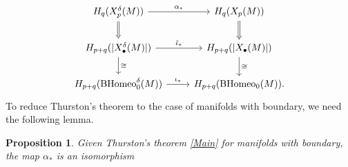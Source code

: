 \documentclass[a4paper]{amsart}
\newtheorem{prop}[thm]{Proposition}
\theoremstyle{definition}
\theoremstyle{remark}
\newcommand{\tH}{\text{\textnormal{Homeo}}}
\newcommand{\BH}{\mathrm{B}\text{\textnormal{Homeo}}}
\newcommand{\tdH}{\text{Homeo}^{\delta}}
\newcommand{\BdH}{\mathrm{B}\text{\textnormal{Homeo}}^{\delta}}
\numberwithin{equation}{section}
\begin{document}
%
\begin{equation}\label{eq:5}
\begin{gathered}
\begin{tikzcd}
H_q(X_{p}^{\delta}(M))\arrow["\alpha_*"]{r}\arrow[Rightarrow]{d}&H_q(X_{p}(M))\arrow[Rightarrow]{d}\\H_{p+q}(|X_{\bullet}^{\delta}(M)|)\arrow["\tilde{\iota}_*"]{r}\arrow["\cong"]{d}& H_{p+q}(|X_{\bullet}(M)|)\arrow["\cong"]{d}\\ H_{p+q}(\BdH_0(M))\arrow["\iota_*"]{r}& H_{p+q}(\BH_0(M)).
\end{tikzcd}
\end{gathered}
\end{equation}
To reduce Thurston's theorem to the case of manifolds with boundary, we need the following lemma.
\begin{prop}\label{lem2}
Given Thurston's theorem \ref{Main} for manifolds with boundary, the map $\alpha_*$ is an isomorphism
\end{prop}
\end{document}
